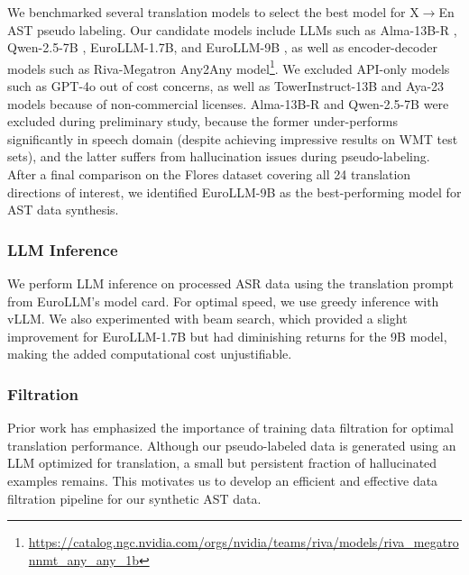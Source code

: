We benchmarked several translation models to select the best model for X$\rightarrow$En AST pseudo labeling.
Our candidate models include LLMs such as Alma-13B-R \cite{xu2024a}, Qwen-2.5-7B \cite{qwen2}, EuroLLM-1.7B, and EuroLLM-9B \cite{DBLP:journals/corr/abs-2409-16235}, as well as encoder-decoder models such as 
Riva-Megatron Any2Any model\footnote{\url{https://catalog.ngc.nvidia.com/orgs/nvidia/teams/riva/models/riva_megatronnmt_any_any_1b}}. 
We excluded API-only models such as GPT-4o out of cost concerns, as well as TowerInstruct-13B and Aya-23 models because of non-commercial licenses.
Alma-13B-R and Qwen-2.5-7B were excluded during preliminary study, because the former under-performs significantly in speech domain (despite achieving impressive results on WMT test sets), and the latter suffers from hallucination issues during pseudo-labeling.
After a final comparison on the Flores dataset \cite{goyal-etal-2022-flores} covering all 24 translation directions of interest, we identified EuroLLM-9B as the best-performing model for AST data synthesis.

\subsubsection{LLM Inference}

We perform LLM inference on processed ASR data using the translation prompt from EuroLLM's model card.
For optimal speed, we use greedy inference with vLLM.
We also experimented with beam search, which provided a slight improvement for EuroLLM-1.7B but had diminishing returns for the 9B model, making the added computational cost unjustifiable.

\subsubsection{Filtration}

Prior work \cite{koehn-etal-2020-findings,peter-etal-2023-theres,finkelstein-etal-2024-introducing} has emphasized the importance of training data filtration for optimal translation performance.
Although our pseudo-labeled data is generated using an LLM optimized for translation, a small but persistent fraction of hallucinated examples remains.
This motivates us to develop an efficient and effective data filtration pipeline for our synthetic AST data.

